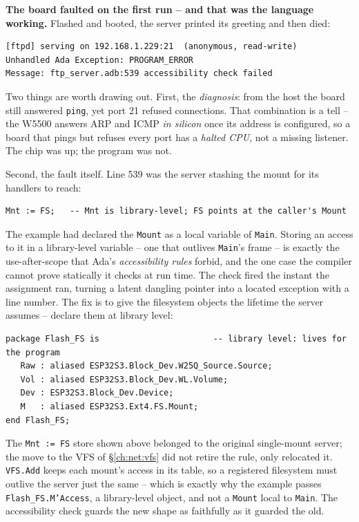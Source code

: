 \textbf{The board faulted on the first run -- and that was the language working.}
Flashed and booted, the server printed its greeting and then died:

\begin{lstlisting}[style=sh]
[ftpd] serving on 192.168.1.229:21  (anonymous, read-write)
Unhandled Ada Exception: PROGRAM_ERROR
Message: ftp_server.adb:539 accessibility check failed
\end{lstlisting}

Two things are worth drawing out. First, the \emph{diagnosis}: from the host the
board still answered \texttt{ping}, yet port 21 refused connections. That
combination is a tell -- the W5500 answers ARP and ICMP \emph{in silicon} once its
address is configured, so a board that pings but refuses every port has a
\emph{halted CPU}, not a missing listener. The chip was up; the program was not.

Second, the fault itself. Line 539 was the server stashing the mount for its
handlers to reach:

\begin{lstlisting}
Mnt := FS;   -- Mnt is library-level; FS points at the caller's Mount
\end{lstlisting}

The example had declared the \texttt{Mount} as a local variable of \texttt{Main}.
Storing an access to it in a library-level variable -- one that outlives
\texttt{Main}'s frame -- is exactly the use-after-scope that Ada's
\emph{accessibility rules} forbid, and the one case the compiler cannot prove
statically it checks at run time. The check fired the instant the assignment ran,
turning a latent dangling pointer into a located exception with a line number. The
fix is to give the filesystem objects the lifetime the server assumes -- declare
them at library level:

\begin{lstlisting}
package Flash_FS is                       -- library level: lives for the program
   Raw : aliased ESP32S3.Block_Dev.W25Q_Source.Source;
   Vol : aliased ESP32S3.Block_Dev.WL.Volume;
   Dev : ESP32S3.Block_Dev.Device;
   M   : aliased ESP32S3.Ext4.FS.Mount;
end Flash_FS;
\end{lstlisting}

The \texttt{Mnt := FS} store shown above belonged to the original single-mount
server; the move to the VFS of \S\ref{ch:net:vfs} did not retire the rule, only
relocated it. \texttt{VFS.Add} keeps each mount's access in its table, so a
registered filesystem must outlive the server just the same -- which is exactly
why the example passes \texttt{Flash\_FS.M'Access}, a library-level object, and not
a \texttt{Mount} local to \texttt{Main}. The accessibility check guards the new
shape as faithfully as it guarded the old.

